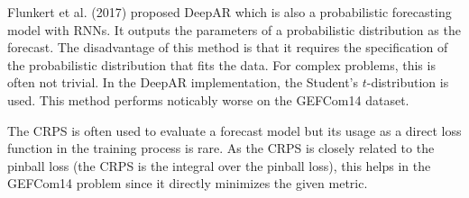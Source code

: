 Flunkert et al. (2017) proposed DeepAR which is also a 
probabilistic forecasting model with RNNs. It outputs the 
parameters of a probabilistic distribution as the forecast. 
The disadvantage of this method is that it requires the 
specification of the probabilistic distribution that fits the data. 
For complex problems, this is often not trivial. 
In the DeepAR implementation, the Student's \(t\)-distribution is used. 
This method performs noticably worse on the GEFCom14 dataset. 

The CRPS is often used to evaluate a forecast model but its usage as 
a direct loss function in the training process is rare. 
As the CRPS is closely related to the pinball loss 
(the CRPS is the integral over the pinball loss), this helps in 
the GEFCom14 problem since it directly minimizes the given metric.
